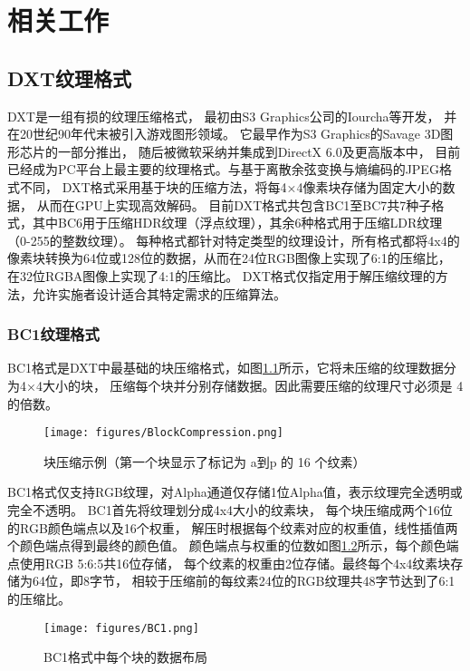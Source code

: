 
\chapter{相关工作}

\section{DXT纹理格式}

DXT是一组有损的纹理压缩格式，
最初由S3 Graphics公司的Iourcha等\cite{iourcha1999system}开发，
并在20世纪90年代末被引入游戏图形领域。
它最早作为S3 Graphics的Savage 3D图形芯片的一部分推出，
随后被微软采纳并集成到DirectX 6.0及更高版本中，
目前已经成为PC平台上最主要的纹理格式。与基于离散余弦变换与熵编码的JPEG格式不同，
DXT格式采用基于块的压缩方法，将每4×4像素块存储为固定大小的数据，
从而在GPU上实现高效解码。
目前DXT格式共包含BC1至BC7共7种子格式，其中BC6用于压缩HDR纹理（浮点纹理），其余6种格式用于压缩LDR纹理（0-255的整数纹理）。
每种格式都针对特定类型的纹理设计，所有格式都将4x4的像素块转换为64位或128位的数据，从而在24位RGB图像上实现了6:1的压缩比，
在32位RGBA图像上实现了4:1的压缩比。
DXT格式仅指定用于解压缩纹理的方法，允许实施者设计适合其特定需求的压缩算法。

\subsection{BC1纹理格式}

BC1格式是DXT中最基础的块压缩格式，如图\ref{fig:BlockCompression}所示，它将未压缩的纹理数据分为4×4大小的块，
压缩每个块并分别存储数据。因此需要压缩的纹理尺寸必须是 4 的倍数。

\begin{figure}[htbp]
    \centering
    \texttt{[image: figures/BlockCompression.png]}
    \caption{块压缩示例（第一个块显示了标记为 a到p 的 16 个纹素）\cite{BC1-5}}
    \label{fig:BlockCompression}
\end{figure}

BC1格式仅支持RGB纹理，对Alpha通道仅存储1位Alpha值，表示纹理完全透明或完全不透明。
BC1首先将纹理划分成4x4大小的纹素块，
每个块压缩成两个16位的RGB颜色端点以及16个权重，
解压时根据每个纹素对应的权重值，线性插值两个颜色端点得到最终的颜色值。
颜色端点与权重的位数如图\ref{fig:BC1}所示，每个颜色端点使用RGB 5:6:5共16位存储，
每个纹素的权重由2位存储。最终每个4x4纹素块存储为64位，即8字节，
相较于压缩前的每纹素24位的RGB纹理共48字节达到了6:1的压缩比。

\begin{figure}[htbp]
    \centering
    \texttt{[image: figures/BC1.png]}
    \caption{BC1格式中每个块的数据布局\cite{BC1-5}}
    \label{fig:BC1}
\end{figure}

